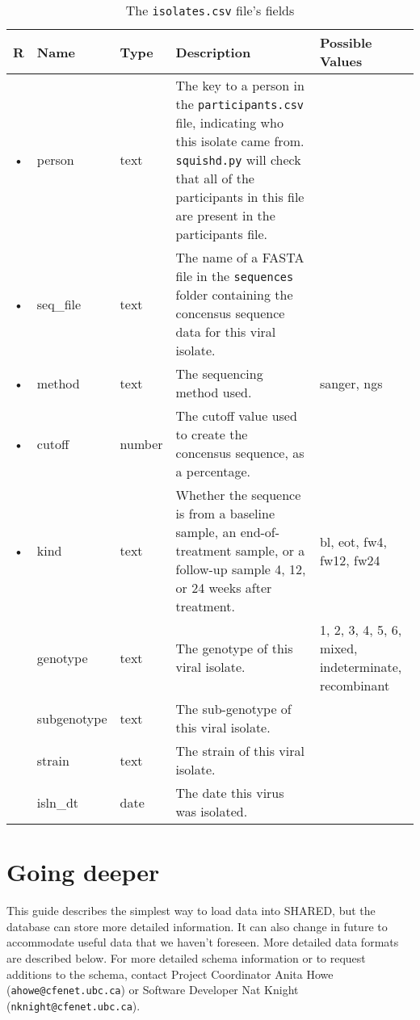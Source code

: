 \documentclass{article}
\begin{document}
\begin{table}
  \centering
  \caption{The \texttt{isolates.csv} file's fields}
  \label{tbl:isolates.csv}
  \begin{tabular}{cllp{6cm}p{4cm}}
    R & Name        & Type      & Description & Possible Values\\ \hline
    • & person      & text    & The key to a person in the
    \texttt{participants.csv} file, indicating who this isolate came
    from. \texttt{squishd.py} will check that all of the participants
    in this file are present in the participants file. & \\
    • & seq\_file   & text    & The name of a FASTA file in the
    \texttt{sequences} folder containing the concensus sequence data for this viral isolate. & \\ 
    • & method      & text    & The sequencing method used. & sanger, ngs \\
    • & cutoff      & number  & The cutoff value used to create the concensus sequence, as a percentage. & \\
    • & kind        & text    & Whether the sequence is from a baseline sample, an end-of-treatment sample, or a follow-up sample 4, 12, or 24 weeks after treatment. & bl, eot, fw4, fw12, fw24 \\
    & genotype    & text    & The genotype of this viral isolate. &
    1, 2, 3, 4, 5, 6, mixed, indeterminate, recombinant \\
    & subgenotype & text    & The sub-genotype of this viral isolate. & \\
    & strain      & text    & The strain of this viral isolate. & \\
    & isln\_dt    & date      & The date this virus was isolated. & \\
    
  \end{tabular}
\end{table}


\section{Going deeper}

This guide describes the simplest way to load data into SHARED, but
the database can store more detailed information. It can also change
in future to accommodate useful data that we haven't foreseen. More
detailed data formats are described below. For more detailed schema
information or to request additions to the schema, contact Project
Coordinator Anita Howe (\texttt{ahowe@cfenet.ubc.ca}) or Software
Developer Nat Knight (\texttt{nknight@cfenet.ubc.ca}).
\end{document}
